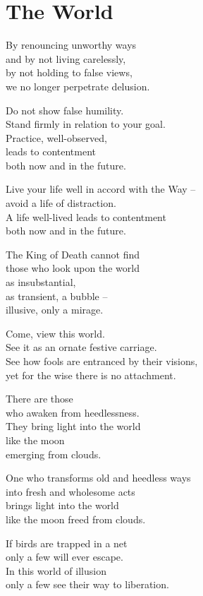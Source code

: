 
\chapter{The World}


By renouncing unworthy ways\\
and by not living carelessly,\\
by not holding to false views,\\
we no longer perpetrate delusion.


Do not show false humility.\\
Stand firmly in relation to your goal.\\
Practice, well-observed,\\
leads to contentment\\
both now and in the future.


Live your life well in accord with the Way --\\
avoid a life of distraction.\\
A life well-lived leads to contentment\\
both now and in the future.


The King of Death cannot find\\
those who look upon the world\\
as insubstantial,\\
as transient, a bubble --\\
illusive, only a mirage.


Come, view this world.\\
See it as an ornate festive carriage.\\
See how fools are entranced by their visions,\\
yet for the wise there is no attachment.


There are those\\
who awaken from heedlessness.\\
They bring light into the world\\
like the moon\\
emerging from clouds.


One who transforms old and heedless ways\\
into fresh and wholesome acts\\
brings light into the world\\
like the moon freed from clouds.


If birds are trapped in a net\\
only a few will ever escape.\\
In this world of illusion\\
only a few see their way to liberation.


